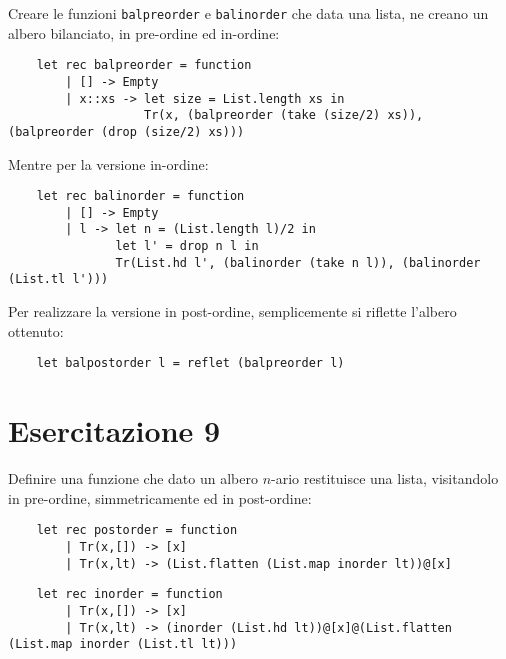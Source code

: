 \documentclass{article}
\numberwithin{equation}{subsection}
\begin{document}

Creare le funzioni \verb|balpreorder| e \verb|balinorder| che data una lista, ne creano un albero bilanciato, in pre-ordine ed in-ordine:
\begin{verbatim}
    let rec balpreorder = function
        | [] -> Empty
        | x::xs -> let size = List.length xs in 
                   Tr(x, (balpreorder (take (size/2) xs)), (balpreorder (drop (size/2) xs)))
\end{verbatim} 
Mentre per la versione in-ordine:
\begin{verbatim}
    let rec balinorder = function
        | [] -> Empty
        | l -> let n = (List.length l)/2 in 
               let l' = drop n l in 
               Tr(List.hd l', (balinorder (take n l)), (balinorder (List.tl l')))
\end{verbatim}
Per realizzare la versione in post-ordine, semplicemente si riflette l'albero ottenuto:
\begin{verbatim}
    let balpostorder l = reflet (balpreorder l)    
\end{verbatim}

\clearpage

\section{Esercitazione 9}



Definire una funzione che dato un albero $n$-ario restituisce una lista, visitandolo in pre-ordine, simmetricamente ed in post-ordine:
\begin{verbatim}
    let rec postorder = function
        | Tr(x,[]) -> [x]
        | Tr(x,lt) -> (List.flatten (List.map inorder lt))@[x]
\end{verbatim}
\begin{verbatim}
    let rec inorder = function
        | Tr(x,[]) -> [x]
        | Tr(x,lt) -> (inorder (List.hd lt))@[x]@(List.flatten (List.map inorder (List.tl lt)))
\end{verbatim}





\clearpage
\end{document}
